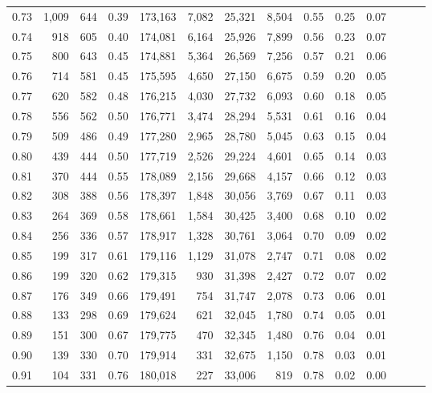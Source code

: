 \begin{tabular}{rrrrrrrrrrrrrr}
0.73 &  1,009 &  644 &  0.39 &  173,163 &    7,082 &  25,321 &   8,504 &  0.55 &  0.25 &      0.07 \\
0.74 &    918 &  605 &  0.40 &  174,081 &    6,164 &  25,926 &   7,899 &  0.56 &  0.23 &      0.07 \\
0.75 &    800 &  643 &  0.45 &  174,881 &    5,364 &  26,569 &   7,256 &  0.57 &  0.21 &      0.06 \\
0.76 &    714 &  581 &  0.45 &  175,595 &    4,650 &  27,150 &   6,675 &  0.59 &  0.20 &      0.05 \\
0.77 &    620 &  582 &  0.48 &  176,215 &    4,030 &  27,732 &   6,093 &  0.60 &  0.18 &      0.05 \\
0.78 &    556 &  562 &  0.50 &  176,771 &    3,474 &  28,294 &   5,531 &  0.61 &  0.16 &      0.04 \\
0.79 &    509 &  486 &  0.49 &  177,280 &    2,965 &  28,780 &   5,045 &  0.63 &  0.15 &      0.04 \\
0.80 &    439 &  444 &  0.50 &  177,719 &    2,526 &  29,224 &   4,601 &  0.65 &  0.14 &      0.03 \\
0.81 &    370 &  444 &  0.55 &  178,089 &    2,156 &  29,668 &   4,157 &  0.66 &  0.12 &      0.03 \\
0.82 &    308 &  388 &  0.56 &  178,397 &    1,848 &  30,056 &   3,769 &  0.67 &  0.11 &      0.03 \\
0.83 &    264 &  369 &  0.58 &  178,661 &    1,584 &  30,425 &   3,400 &  0.68 &  0.10 &      0.02 \\
0.84 &    256 &  336 &  0.57 &  178,917 &    1,328 &  30,761 &   3,064 &  0.70 &  0.09 &      0.02 \\
0.85 &    199 &  317 &  0.61 &  179,116 &    1,129 &  31,078 &   2,747 &  0.71 &  0.08 &      0.02 \\
0.86 &    199 &  320 &  0.62 &  179,315 &      930 &  31,398 &   2,427 &  0.72 &  0.07 &      0.02 \\
0.87 &    176 &  349 &  0.66 &  179,491 &      754 &  31,747 &   2,078 &  0.73 &  0.06 &      0.01 \\
0.88 &    133 &  298 &  0.69 &  179,624 &      621 &  32,045 &   1,780 &  0.74 &  0.05 &      0.01 \\
0.89 &    151 &  300 &  0.67 &  179,775 &      470 &  32,345 &   1,480 &  0.76 &  0.04 &      0.01 \\
0.90 &    139 &  330 &  0.70 &  179,914 &      331 &  32,675 &   1,150 &  0.78 &  0.03 &      0.01 \\
0.91 &    104 &  331 &  0.76 &  180,018 &      227 &  33,006 &     819 &  0.78 &  0.02 &      0.00 \\

\end{tabular}
